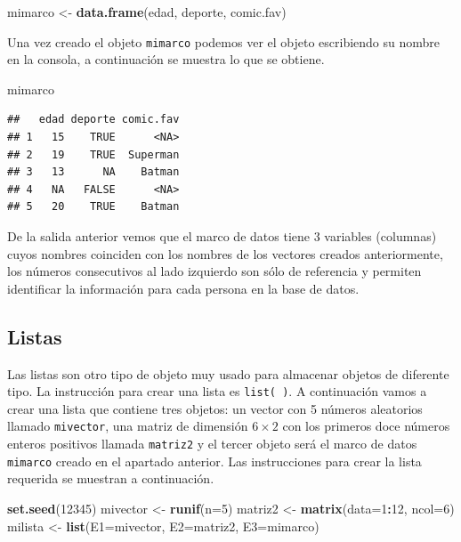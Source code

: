\documentclass[10pt,]{krantz}
\makeatletter
\newenvironment{Shaded}{\begin{snugshade}}{\end{snugshade}}
\newcommand{\KeywordTok}[1]{\textcolor[rgb]{0.13,0.29,0.53}{\textbf{#1}}}
\newcommand{\DataTypeTok}[1]{\textcolor[rgb]{0.13,0.29,0.53}{#1}}
\newcommand{\DecValTok}[1]{\textcolor[rgb]{0.00,0.00,0.81}{#1}}
\newcommand{\StringTok}[1]{\textcolor[rgb]{0.31,0.60,0.02}{#1}}
\newcommand{\OperatorTok}[1]{\textcolor[rgb]{0.81,0.36,0.00}{\textbf{#1}}}
\newcommand{\NormalTok}[1]{#1}
\newenvironment{kframe}{%
\medskip{}
\setlength{\fboxsep}{.8em}
 \def\at@end@of@kframe{}%
 \ifinner\ifhmode%
  \def\at@end@of@kframe{\end{minipage}}%
  \begin{minipage}{\columnwidth}%
 \fi\fi%
 \def\FrameCommand##1{\hskip\@totalleftmargin \hskip-\fboxsep
 \colorbox{shadecolor}{##1}\hskip-\fboxsep
     \hskip-\linewidth \hskip-\@totalleftmargin \hskip\columnwidth}%
 \MakeFramed {\advance\hsize-\width
   \@totalleftmargin\z@ \linewidth\hsize
   \@setminipage}}%
 {\par\unskip\endMakeFramed%
 \at@end@of@kframe}
\renewenvironment{Shaded}{\begin{kframe}}{\end{kframe}}
\makeatother
\begin{document}
\begin{Shaded}
\begin{Highlighting}[]
\NormalTok{mimarco <-}\StringTok{ }\KeywordTok{data.frame}\NormalTok{(edad, deporte, comic.fav)}
\end{Highlighting}
\end{Shaded}

Una vez creado el objeto \texttt{mimarco} podemos ver el objeto
escribiendo su nombre en la consola, a continuación se muestra lo que se
obtiene.

\begin{Shaded}
\begin{Highlighting}[]
\NormalTok{mimarco}
\end{Highlighting}
\end{Shaded}

\begin{verbatim}
##   edad deporte comic.fav
## 1   15    TRUE      <NA>
## 2   19    TRUE  Superman
## 3   13      NA    Batman
## 4   NA   FALSE      <NA>
## 5   20    TRUE    Batman
\end{verbatim}

De la salida anterior vemos que el marco de datos tiene 3 variables
(columnas) cuyos nombres coinciden con los nombres de los vectores
creados anteriormente, los números consecutivos al lado izquierdo son
sólo de referencia y permiten identificar la información para cada
persona en la base de datos.

\subsection{Listas}

Las listas  son otro tipo de objeto muy usado para
almacenar objetos de diferente tipo. La instrucción para crear una lista
es \texttt{list(\ )}. A continuación vamos a crear una lista que
contiene tres objetos: un vector con 5 números aleatorios llamado
\texttt{mivector}, una matriz de dimensión \(6 \times 2\) con los
primeros doce números enteros positivos llamada \texttt{matriz2} y el
tercer objeto será el marco de datos \texttt{mimarco} creado en el
apartado anterior. Las instrucciones para crear la lista requerida se
muestran a continuación.

\begin{Shaded}
\begin{Highlighting}[]
\KeywordTok{set.seed}\NormalTok{(}\DecValTok{12345}\NormalTok{)}
\NormalTok{mivector <-}\StringTok{ }\KeywordTok{runif}\NormalTok{(}\DataTypeTok{n=}\DecValTok{5}\NormalTok{)}
\NormalTok{matriz2 <-}\StringTok{ }\KeywordTok{matrix}\NormalTok{(}\DataTypeTok{data=}\DecValTok{1}\OperatorTok{:}\DecValTok{12}\NormalTok{, }\DataTypeTok{ncol=}\DecValTok{6}\NormalTok{)}
\NormalTok{milista <-}\StringTok{ }\KeywordTok{list}\NormalTok{(}\DataTypeTok{E1=}\NormalTok{mivector, }\DataTypeTok{E2=}\NormalTok{matriz2, }\DataTypeTok{E3=}\NormalTok{mimarco)}
\end{Highlighting}
\end{Shaded}
\end{document}
